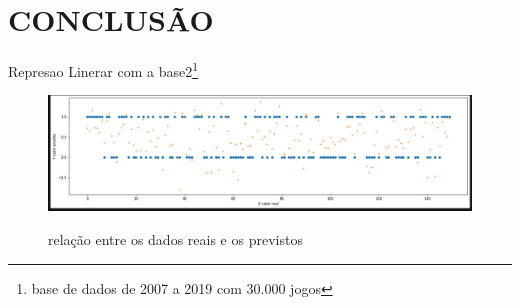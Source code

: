 \section{CONCLUSÃO}
Represao Linerar com a base2\footnote[5]{base de dados de 2007 a 2019 com 30.000 jogos} 
\begin{figure}[htbp]
	\begin{center}
		\includegraphics[width=1\linewidth]{imagens/regressailinearAPI.png}\\
	\end{center}
	\caption[relação entre os dados reais e os previstos]{relação entre os dados reais e os previstos}
	\label{fig:logo}
\end{figure}